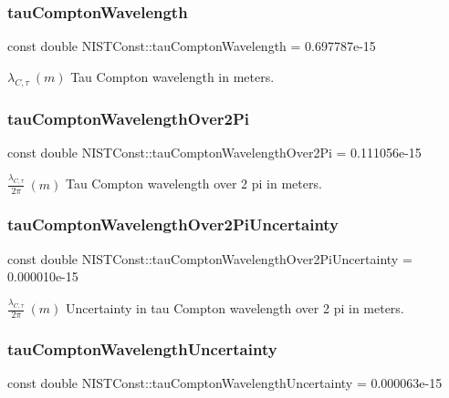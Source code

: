 \subsubsection{\texorpdfstring{tau\+Compton\+Wavelength}{tauComptonWavelength}}
{\footnotesize\ttfamily const double N\+I\+S\+T\+Const\+::tau\+Compton\+Wavelength = 0.\+697787e-\/15}

$\lambda_{C,\tau} \ (m)$ Tau Compton wavelength in meters. \mbox{\label{group___tau_ga3cca663c9ba88e04346cbd29643aba14}} 
\subsubsection{\texorpdfstring{tau\+Compton\+Wavelength\+Over2\+Pi}{tauComptonWavelengthOver2Pi}}
{\footnotesize\ttfamily const double N\+I\+S\+T\+Const\+::tau\+Compton\+Wavelength\+Over2\+Pi = 0.\+111056e-\/15}

$\frac{\lambda_{C,\tau}}{2\pi} \ (m)$ Tau Compton wavelength over 2 pi in meters. \mbox{\label{group___tau_gab9853e108c4a32f465e14d286cedde7c}} 
\subsubsection{\texorpdfstring{tau\+Compton\+Wavelength\+Over2\+Pi\+Uncertainty}{tauComptonWavelengthOver2PiUncertainty}}
{\footnotesize\ttfamily const double N\+I\+S\+T\+Const\+::tau\+Compton\+Wavelength\+Over2\+Pi\+Uncertainty = 0.\+000010e-\/15}

$\frac{\lambda_{C,\tau}}{2\pi} \ (m)$ Uncertainty in tau Compton wavelength over 2 pi in meters. \mbox{\label{group___tau_ga05d2cb36c4bf4734ebedd983535cf27e}} 
\subsubsection{\texorpdfstring{tau\+Compton\+Wavelength\+Uncertainty}{tauComptonWavelengthUncertainty}}
{\footnotesize\ttfamily const double N\+I\+S\+T\+Const\+::tau\+Compton\+Wavelength\+Uncertainty = 0.\+000063e-\/15}

